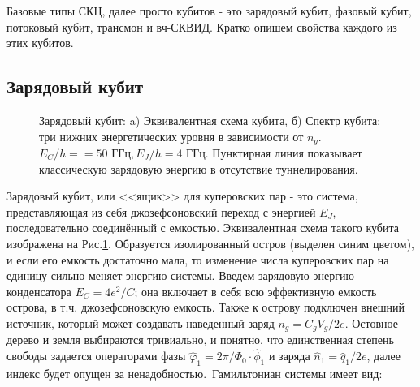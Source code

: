 Базовые типы СКЦ, далее просто кубитов - это зарядовый кубит, фазовый кубит, потоковый кубит, трансмон и вч-СКВИД. Кратко опишем свойства каждого из этих кубитов.
\subsection{Зарядовый кубит}\label{charge_q}
	\begin{figure}[b]
		{ \raggedleft
			\hfill
			\def\svgwidth{2in}
			\fontsize{19pt}{19pt}\selectfont
			\hfill
			\def\svgwidth{4in}
			
			\hfill
		}
		\caption[Схема зарядового кубита и его спектр.]{Зарядовый кубит: a) Эквивалентная схема кубита, б) Спектр кубита: три нижних энергетических уровня в зависимости от $n_g$. $E_C/h=\!=\!50 \text{ ГГц}, E_J/h\!=\!4\text{ ГГц}$. Пунктирная линия показывает классическую зарядовую энергию в отсутствие туннелирования.}
		\label{img: CPB}
		
	\end{figure}
Зарядовый кубит, или <<ящик>> для куперовских пар - это система, представляющая из себя джозефсоновский переход с энергией $E_J$, последовательно соединённый с емкостью. Эквивалентная схема такого кубита изображена на Рис.\ref{img: CPB}. Образуется изолированный остров (выделен синим цветом), и если его емкость достаточно мала, то изменение числа куперовских пар на единицу сильно меняет энергию системы.  Введем зарядовую энергию конденсатора $E_C = 4e^2/C$; она включает в себя всю эффективную емкость острова, в т.ч. джозефсоновскую емкость. Также к острову подключен внешний источник, который может создавать наведенный заряд $n_g = C_gV_g/2e$.   Остовное дерево и земля выбираются тривиально, и понятно, что единственная степень свободы задается операторами фазы $\hat{\varphi}_1\!=\!2\pi/\Phi_0\!\cdot\!\hat{\phi}_1$ и заряда $\hat{n}_1\!=\!\hat{q}_1/2e$, далее индекс будет опущен за ненадобностью.~Гамильтониан системы имеет вид:
